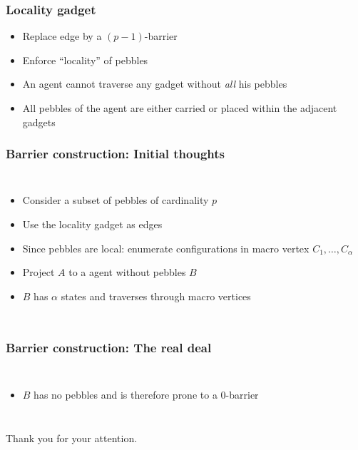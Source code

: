 \documentclass{beamer}
\begin{document}
\begin{frame}
  \frametitle{Locality gadget}
  \begin{itemize}
    \item Replace edge by a $(p-1)$-barrier
    \item Enforce \enquote{locality} of pebbles
    \item An agent cannot traverse any gadget without \emph{all} his pebbles
    \item All pebbles of the agent are either carried or placed within the
      adjacent gadgets
  \end{itemize}
  \begin{center}
  \end{center}
\end{frame}

\begin{frame}
  \frametitle{Barrier construction: Initial thoughts}
  \begin{columns}
    \begin{itemize}
      \item Consider a subset of pebbles of cardinality $p$
      \item Use the locality gadget as edges
      \item Since pebbles are local: enumerate configurations in macro vertex
        $C_{1},\dots,C_{\alpha}$
      \item Project $A$ to a agent without pebbles $B$
      \item $B$ has $\alpha$ states and traverses through macro vertices
    \end{itemize}
    \resizebox{\textwidth}{!}{}
  \end{columns}
\end{frame}

\begin{frame}
  \frametitle{Barrier construction: The real deal}
  \begin{columns}
    \begin{itemize}
      \item $B$ has no pebbles and is therefore prone to a $0$-barrier
    \end{itemize}
  \end{columns}
\end{frame}

\begin{frame}
  \begin{center}
    \Huge Thank you for your attention.
  \end{center}
\end{frame}
\end{document}
